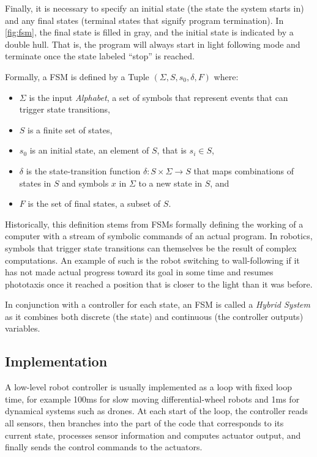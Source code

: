 Finally, it is necessary to specify an initial state (the state the system starts in) and any final states (terminal states that signify program termination). In \cref{fig:fsm}, the final state is filled in gray, and the initial state is indicated by a double hull. That is, the program will always start in light following mode and terminate once the state labeled ``stop'' is reached.


Formally, a FSM is defined by a Tuple $(\Sigma, S, s_0, \delta, F)$ where:
\begin{itemize}
\item $\Sigma$ is the input \textsl{Alphabet}, a set of symbols that represent events that can trigger state transitions,
\item $S$ is a finite set of states,
\item $s_0$ is an initial state, an element of $S$, that is $s_i \in S$,
\item $\delta$ is the state-transition function $\delta: S \times \Sigma \rightarrow S$ that maps combinations of states in $S$ and symbols $x$ in $\Sigma$ to a new state in $S$, and
\item $F$ is the set of final states, a subset of $S$.
\end{itemize}

Historically, this definition stems from FSMs formally defining the working of a computer with a stream of symbolic commands of an actual program. In robotics, symbols that trigger state transitions can themselves be the result of complex computations. An example of such is the robot switching to wall-following if it has not made actual progress toward its goal in some time and resumes phototaxis once it reached a position that is closer to the light than it was before.

In conjunction with a controller for each state, an FSM is called a \textsl{Hybrid System}\cite{van2000introduction} as it combines both discrete (the state) and continuous (the controller outputs) variables.

\subsection{Implementation}
A low-level robot controller is usually implemented as a loop with fixed loop time, for example 100ms for slow moving differential-wheel robots and 1ms for dynamical systems such as drones. At each start of the loop, the controller reads all sensors, then branches into the part of the code that corresponds to its current state, processes sensor information and computes actuator output, and finally sends the control commands to the actuators.

